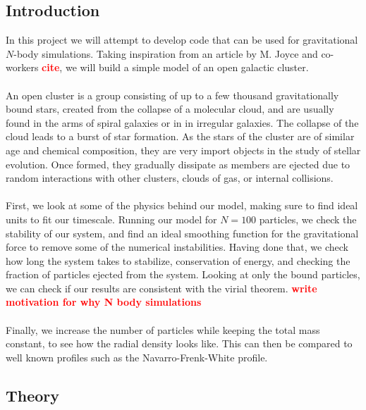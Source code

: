 \documentclass{article}
\newcommand\red[1]{\textcolor{red}{\textbf{#1}}}
\begin{document}
\subsection{Introduction}
In this project we will attempt to develop code that can be used for gravitational $N$-body simulations. Taking inspiration from an article by M. Joyce and co-workers \red{cite}, we will build a simple model of an open galactic cluster.
\\\\
An open cluster is a group consisting of up to a few thousand gravitationally bound stars, created from the collapse of a molecular cloud, and are usually found in the arms of spiral galaxies or in in irregular galaxies. The collapse of the cloud leads to a burst of star formation. As the stars of the cluster are of similar age and chemical composition, they are very import objects in the study of stellar evolution. Once formed, they gradually dissipate as members are ejected due to random interactions with other clusters, clouds of gas, or internal collisions.
\\\\
First, we look at some of the physics behind our model, making sure to find ideal units to fit our timescale. Running our model for $N = 100$ particles, we check the stability of our system, and find an ideal smoothing function for the gravitational force to remove some of the numerical instabilities. Having done that, we check how long the system takes to stabilize, conservation of energy, and checking the fraction of particles ejected from the system. Looking at only the bound particles, we can check if our results are consistent with the virial theorem.
\red{write motivation for why N body simulations}
\\\\
Finally, we increase the number of particles while keeping the total mass constant, to see how the radial density looks like. This can then be compared to well known profiles such as the Navarro-Frenk-White profile.

\subsection{Theory}
\end{document}
